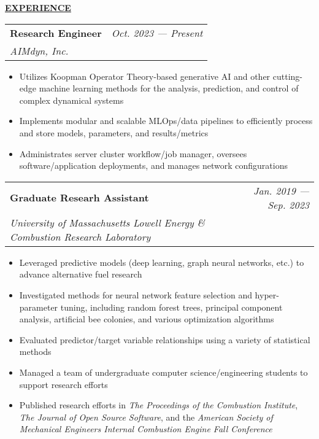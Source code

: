 \documentclass{letter}
\begin{document}
    \medskip \large \textbf{\underline{EXPERIENCE}} \medskip \normalsize

    \setlength\tabcolsep{0cm}
    \begin{tabular*}{\linewidth}{L r}
        \textbf{Research Engineer} & \textit{Oct. 2023 --- Present} \\
        \textit{AIMdyn, Inc.} & 
    \end{tabular*}

    \small
    \begin{itemize}[leftmargin=0.75cm]
        \setlength{\itemsep}{0pt}
        \item Utilizes Koopman Operator Theory-based generative AI and other cutting-edge machine learning methods for the analysis, prediction, and control of complex dynamical systems
        \item Implements modular and scalable MLOps/data pipelines to efficiently process and store models, parameters, and results/metrics
        \item Administrates server cluster workflow/job manager, oversees software/application deployments, and manages network configurations
    \end{itemize}
    \normalsize

    \begin{tabular*}{\linewidth}{L r}
        \textbf{Graduate Researh Assistant} & \textit{Jan. 2019 --- Sep. 2023} \\
        \textit{University of Massachusetts Lowell Energy \& Combustion Research Laboratory} & 
    \end{tabular*}

    \small
    \begin{itemize}[leftmargin=0.75cm]
        \setlength{\itemsep}{0pt}
        \item Leveraged predictive models (deep learning, graph neural networks, etc.) to advance alternative fuel research
        \item Investigated methods for neural network feature selection and hyper-parameter tuning, including random forest trees, principal component analysis, artificial bee colonies, and various optimization algorithms
        \item Evaluated predictor/target variable relationships using a variety of statistical methods
        \item Managed a team of undergraduate computer science/engineering students to support research efforts
        \item Published research efforts in \textit{The Proceedings of the Combustion Institute}, \textit{The Journal of Open Source Software}, and the \textit{American Society of Mechanical Engineers Internal Combustion Engine Fall Conference}
    \end{itemize}
    \normalsize
\end{document}
